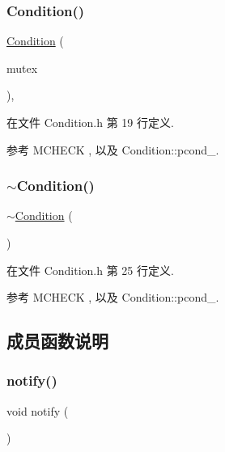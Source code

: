 \subsubsection{\texorpdfstring{Condition()}{Condition()}}
{\footnotesize\ttfamily \hyperlink{classmuduo_1_1Condition}{Condition} (\begin{DoxyParamCaption}\item[{Mutex\+Lock \&}]{mutex }\end{DoxyParamCaption})\hspace{0.3cm}{\ttfamily [inline]}, {\ttfamily [explicit]}}



在文件 Condition.\+h 第 19 行定义.



参考 M\+C\+H\+E\+CK , 以及 Condition\+::pcond\+\_\+.

\mbox{\label{classmuduo_1_1Condition_a4fdcd7a3b5f12ae38bd90bb95adf8388}} 
\subsubsection{\texorpdfstring{$\sim$\+Condition()}{~Condition()}}
{\footnotesize\ttfamily $\sim$\hyperlink{classmuduo_1_1Condition}{Condition} (\begin{DoxyParamCaption}{ }\end{DoxyParamCaption})\hspace{0.3cm}{\ttfamily [inline]}}



在文件 Condition.\+h 第 25 行定义.



参考 M\+C\+H\+E\+CK , 以及 Condition\+::pcond\+\_\+.



\subsection{成员函数说明}
\mbox{\label{classmuduo_1_1Condition_a7ff19734eb024bd6f3e2ad95647b1b27}} 
\subsubsection{\texorpdfstring{notify()}{notify()}}
{\footnotesize\ttfamily void notify (\begin{DoxyParamCaption}{ }\end{DoxyParamCaption})\hspace{0.3cm}{\ttfamily [inline]}}



